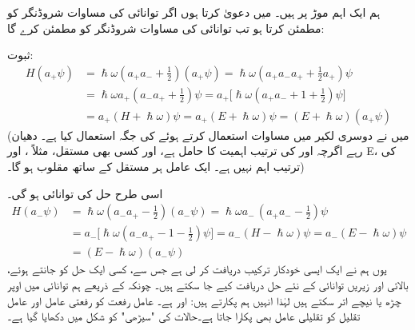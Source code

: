  ہم ایک اہم موڑ پر ہیں۔ میں دعویٰ کرتا ہوں اگر توانائی  کی مساوات شروڈنگر کو  مطمئن کرتا ہو 
  تب توانائی  کی مساوات شروڈنگر کو  مطمئن کرے گا: 

ثبوت:
\begin{align*}
H ( a_+ \psi ) &= \hslash \omega ( a_+ a_- + \frac{1}{2}) (a_+ \psi) = \hslash \omega (a_+ a_- a_+ + \frac{1}{2} a_+) \psi
\\
 &= \hslash \omega a_+ ( a_- a_+ + \tfrac{1}{2} ) \psi = a_+\big[ \hslash \omega ( a_+ a_- + 1 + \tfrac{1}{2} ) \psi \big ]\\
 &= a_+ ( H + \hslash \omega ) \psi = a_+ ( E + \hslash \omega ) \psi = ( E + \hslash \omega ) ( a_+ \psi )
\end{align*} 
(میں نے دوسری لکیر میں مساوات  استعمال کرتے ہوئے 
 کی جگہ  استعمال کیا ہے۔ دھیان رہے اگرچہ  اور  کی ترتیب اہمیت کا حامل ہے، 
 اور کسی بھی مستقل، مثلاً ،  اور E، کی ترتیب اہم نہیں ہے۔ ایک عامل ہر مستقل کے ساتھ مقلوب ہو گا۔)

 اسی طرح حل  کی توانائی  ہو گی۔
\begin{align*}
H(a_- \psi ) &= \hslash \omega ( a_- a_+ - \tfrac{1}{2}) (a_- \psi) = \hslash \omega a_- \,( a_+ a_- - \tfrac{1}{2} ) \psi\\
&= a_- \big[ \hslash \omega ( a_- a_+ - 1 - \tfrac{1}{2} ) \psi \big] = a_- ( H - \hslash \omega )\psi = a_- ( E - \hslash \omega) \psi \\	
&=( E - \hslash \omega ) ( a_- \psi )
\end{align*}
یوں ہم نے ایک ایسی خودکار ترکیب دریافت کر لی ہے جس سے، کسی ایک حل کو جانتے ہوئے، بالائی اور زیریں توانائی کے نئے حل دریافت کیے جا سکتے ہیں۔ چونکہ  کے ذریعے ہم توانائی میں اوپر چڑھ یا نیچے اتر سکتے ہیں لہٰذا انہیں ہم  پکارتے ہیں:   اور   ہے۔ عامل رفعت کو رفعتی عامل اور عامل تقلیل کو تقلیلی عامل بھی پکارا جاتا ہے۔حالات کی "سیڑھی" کو شکل  میں دکھایا گیا ہے۔

